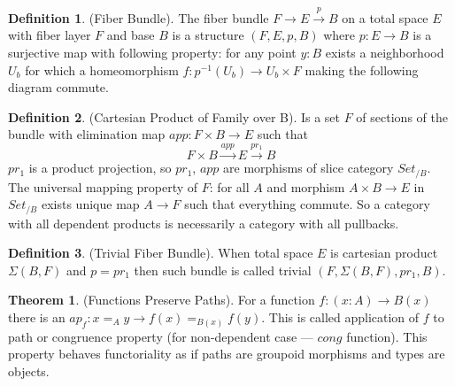 \documentclass{article}
\theoremstyle{definition}
\newtheorem{theorem}{Theorem}
\newtheorem{definition}{Definition}
\def\mapright#1{\xrightarrow{{#1}}}
\begin{document}
\begin{definition} (Fiber Bundle).
The fiber bundle $ F \rightarrow E \mapright{p} B$ on a total space $E$ with fiber layer $F$ and base $B$ is a
structure $(F,E,p,B)$ where $p: E \rightarrow B$ is a surjective map with following property:
for any point $y: B$ exists a neighborhood $U_b$ for which a homeomorphism $f: p^{-1}(U_b) \rightarrow U_b \times F$
making the following diagram commute.
\begin{center}
\end{center}
\end{definition}

\begin{definition} (Cartesian Product of Family over B).
Is a set $F$ of sections of the bundle with elimination map $app : F \times B \rightarrow E$ such that
\begin{equation}
F \times B \mapright{app} E \mapright{pr_1} B
\end{equation}
$pr_1$ is a product projection, so $pr_1$, $app$ are morphisms
of slice category $Set_{/B}$. The universal mapping property of $F$:
for all $A$ and morphism $A \times B \rightarrow E$ in $Set_{/B}$ exists
unique map $A \rightarrow F$ such that everything commute. So a category
with all dependent products is necessarily a category with all pullbacks.
\end{definition}

\begin{definition} (Trivial Fiber Bundle).
When total space $E$ is cartesian product $\Sigma(B,F)$ and $p = pr_1$
then such bundle is called trivial $(F,\Sigma(B,F),pr_1,B)$.
\end{definition}

\begin{theorem} (Functions Preserve Paths).
For a function $f: (x:A) \rightarrow B(x)$
there is an $ap_f : x =_A y \rightarrow f(x) =_{B(x)} f(y)$. This is called
application of $f$ to path or congruence property (for non-dependent case ---
$cong$ function). This property behaves functoriality
as if paths are groupoid morphisms and types are objects.
\end{theorem}
\end{document}
